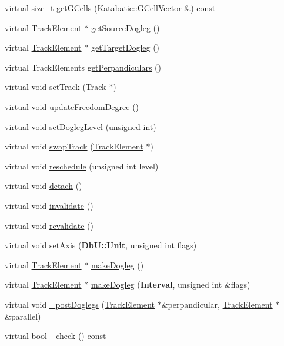 \begin{DoxyCompactItemize}
\item 
virtual size\-\_\-t \hyperlink{classKite_1_1TrackSegment_a79b25d8199fe90446e99cf08d2d85674}{get\-G\-Cells} (Katabatic\-::\-G\-Cell\-Vector \&) const 
\item 
virtual \hyperlink{classKite_1_1TrackElement}{Track\-Element} $\ast$ \hyperlink{classKite_1_1TrackSegment_a7e79fbfe77f173d46b1959c41087930a}{get\-Source\-Dogleg} ()
\item 
virtual \hyperlink{classKite_1_1TrackElement}{Track\-Element} $\ast$ \hyperlink{classKite_1_1TrackSegment_aeb4e39bd925d093e6c45599433bb421c}{get\-Target\-Dogleg} ()
\item 
virtual Track\-Elements \hyperlink{classKite_1_1TrackSegment_aa0ba92ebf19f596537dc051c090d5736}{get\-Perpandiculars} ()
\item 
virtual void \hyperlink{classKite_1_1TrackSegment_abd3d8093f871d3d1a7f24b053648026c}{set\-Track} (\hyperlink{classKite_1_1Track}{Track} $\ast$)
\item 
virtual void \hyperlink{classKite_1_1TrackSegment_af5332d647c0482aa90ad7cc9b2a50f3a}{update\-Freedom\-Degree} ()
\item 
virtual void \hyperlink{classKite_1_1TrackSegment_a2b90319cb042b283aa5d1fdb1992f11f}{set\-Dogleg\-Level} (unsigned int)
\item 
virtual void \hyperlink{classKite_1_1TrackSegment_acc245ce084989d1c34816d0e61b9d510}{swap\-Track} (\hyperlink{classKite_1_1TrackElement}{Track\-Element} $\ast$)
\item 
virtual void \hyperlink{classKite_1_1TrackSegment_a0ffe603ec7d46f21f5e56ccbe84c03fb}{reschedule} (unsigned int level)
\item 
virtual void \hyperlink{classKite_1_1TrackSegment_ac295bade8aee589f6718dfa79edc2a34}{detach} ()
\item 
virtual void \hyperlink{classKite_1_1TrackSegment_a893f1101c650c08c98612515c2b1a89c}{invalidate} ()
\item 
virtual void \hyperlink{classKite_1_1TrackSegment_a5bd93abe1416952ace15a98dbeeed124}{revalidate} ()
\item 
virtual void \hyperlink{classKite_1_1TrackSegment_a262a915c38127d3722ec561b30d80f91}{set\-Axis} ({\bf Db\-U\-::\-Unit}, unsigned int flags)
\item 
virtual \hyperlink{classKite_1_1TrackElement}{Track\-Element} $\ast$ \hyperlink{classKite_1_1TrackSegment_a7a9637875364e84e6862de0102341715}{make\-Dogleg} ()
\item 
virtual \hyperlink{classKite_1_1TrackElement}{Track\-Element} $\ast$ \hyperlink{classKite_1_1TrackSegment_a524f1569b2f2c1a84df2fe47e84e28ed}{make\-Dogleg} ({\bf Interval}, unsigned int \&flags)
\item 
virtual void \hyperlink{classKite_1_1TrackSegment_a10a45c049d0bd7d01c7eff1c5441c7a2}{\-\_\-post\-Doglegs} (\hyperlink{classKite_1_1TrackElement}{Track\-Element} $\ast$\&perpandicular, \hyperlink{classKite_1_1TrackElement}{Track\-Element} $\ast$\&parallel)
\item 
virtual bool \hyperlink{classKite_1_1TrackSegment_aa1ef325b98fab61d2c7c5bdc1fcd92fc}{\-\_\-check} () const 
\end{DoxyCompactItemize}
